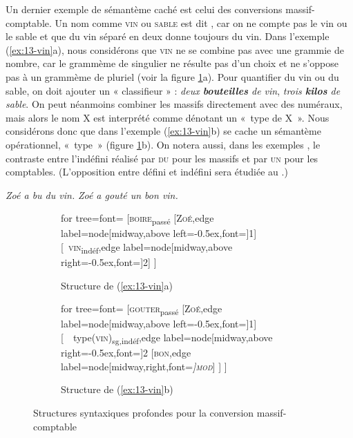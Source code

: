 Un dernier exemple de sémantème caché est celui des conversions massif-comptable. Un nom comme \textsc{vin} ou \textsc{sable} est dit , car on ne compte pas le vin ou le sable et que du vin séparé en deux donne toujours du vin. Dans l’exemple (\ref{ex:13-vin}a), nous considérons que \textsc{vin} ne se combine pas avec une grammie de nombre, car le grammème de singulier ne résulte pas d’un choix et ne s’oppose pas à un grammème de pluriel (voir la figure \ref{fig:13-vin}a). Pour quantifier du vin ou du sable, on doit ajouter un « classifieur » : \textit{deux \textbf{bouteilles} de vin}, \textit{trois \textbf{kilos} de sable}. On peut néanmoins combiner les massifs directement avec des numéraux, mais alors le nom X est interprété comme dénotant un «~type de X~». Nous considérons donc que dans l’exemple (\ref{ex:13-vin}b) se cache un sémantème opérationnel, «~type~» (figure \ref{fig:13-vin}b). On notera aussi, dans les exemples , le contraste entre l’indéfini réalisé par \textsc{du} pour les massifs et par \textsc{un} pour les comptables. (L'opposition entre défini et indéfini sera étudiée au .)

\ea\label{ex:13-vin}
\ea \textit{Zoé a bu du vin.}
\ex \textit{Zoé a gouté un bon vin.}\z\z

\begin{figure}
	\begin{subfigure}[b]{0.5\textwidth}
		\centering
		\begin{forest} for tree={font=\normalfont}
			[\textsc{boire}\textsubscript{passé}
				[\textsc{Zoé},edge label={node[midway,above left=-0.5ex,font=\footnotesize]{1}}]
				[\ \textsc{vin}\textsubscript{indéf},edge label={node[midway,above right=-0.5ex,font=\footnotesize]{2}}]
			]
		\end{forest}
		\caption{Structure de (\ref{ex:13-vin}a)}
	\end{subfigure}%
	\hfill
	\begin{subfigure}[b]{0.5\textwidth}
		\centering
		\begin{forest} for tree={font=\normalfont}
			[\textsc{gouter}\textsubscript{passé}
				[\textsc{Zoé},edge label={node[midway,above left=-0.5ex,font=\footnotesize]{1}}]
				[\ \ type(\textsc{vin})\textsubscript{sg,indéf},edge label={node[midway,above right=-0.5ex,font=\footnotesize]{2}}
					[\textsc{bon},edge label={node[midway,right,font=\footnotesize\itshape]{\textsc{mod}}}]
				]
			]
		\end{forest}
		\caption{Structure de (\ref{ex:13-vin}b)}
	\end{subfigure}
\caption{Structures syntaxiques profondes pour la conversion massif-comptable\label{fig:13-vin}}
\end{figure}

